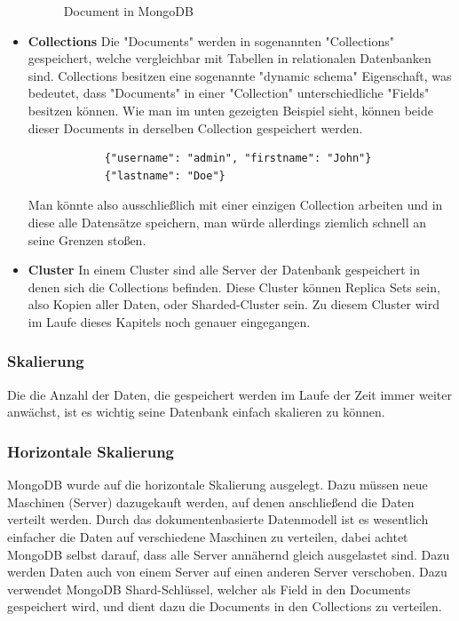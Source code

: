 \begin{itemize}
\begin{figure}[h!]
            \caption{Document in MongoDB}
            \cite{mongodb_document}
            \label{fig:enter-label}
        \end{figure}
        \cite{mongodb_json_vs_bson}
    \item \textbf{Collections}
        \newline
        Die "Documents" werden in sogenannten "Collections" gespeichert, welche vergleichbar mit Tabellen in relationalen Datenbanken sind. Collections besitzen eine sogenannte "dynamic schema" Eigenschaft, was bedeutet, dass "Documents" in einer "Collection" unterschiedliche "Fields" besitzen können. Wie man im unten gezeigten Beispiel sieht, können beide dieser Documents in derselben Collection gespeichert werden.
        \begin{lstlisting}
            {"username": "admin", "firstname": "John"}
            {"lastname": "Doe"}
        \end{lstlisting}
        Man könnte also ausschließlich mit einer einzigen Collection arbeiten und in diese alle Datensätze speichern, man würde allerdings ziemlich schnell an seine Grenzen stoßen.
    \item \textbf{Cluster}
        \newline
        In einem Cluster sind alle Server der Datenbank gespeichert in denen sich die Collections befinden. Diese Cluster können Replica Sets sein, also Kopien aller Daten, oder Sharded-Cluster sein. Zu diesem Cluster wird im Laufe dieses Kapitels noch genauer eingegangen.
        \cite{mongodb_collections}
\end{itemize}

\subsubsection{Skalierung}
Die die Anzahl der Daten, die gespeichert werden im Laufe der Zeit immer weiter anwächst, ist es wichtig seine Datenbank einfach skalieren zu können. 

\subsubsection{Horizontale Skalierung}
MongoDB wurde auf die horizontale Skalierung ausgelegt. Dazu müssen neue Maschinen (Server) dazugekauft werden, auf denen anschließend die Daten verteilt werden. Durch das dokumentenbasierte Datenmodell ist es wesentlich einfacher die Daten auf verschiedene Maschinen zu verteilen, dabei achtet MongoDB selbst darauf, dass alle Server annähernd gleich ausgelastet sind. Dazu werden Daten auch von einem Server auf einen anderen Server verschoben. Dazu verwendet MongoDB Shard-Schlüssel, welcher als Field in den Documents gespeichert wird, und dient dazu die Documents in den Collections zu verteilen.
\cite{mongodb_collections}

